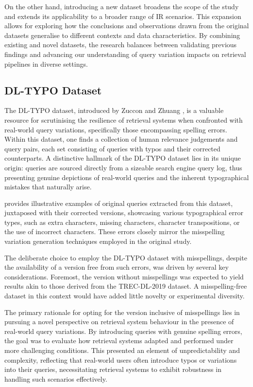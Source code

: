 On the other hand, introducing a new dataset broadens the scope of the study and extends its applicability to a broader range of IR scenarios. This expansion allows for exploring how the conclusions and observations drawn from the original datasets generalise to different contexts and data characteristics. By combining existing and novel datasets, the research balances between validating previous findings and advancing our understanding of query variation impacts on retrieval pipelines in diverse settings.

\subsection{DL-TYPO Dataset}
The DL-TYPO dataset, introduced by Zuccon and Zhuang \cite{characterbert}, is a valuable resource for scrutinising the resilience of retrieval systems when confronted with real-world query variations, specifically those encompassing spelling errors. Within this dataset, one finds a collection of human relevance judgements and query pairs, each set consisting of queries with typos and their corrected counterparts. A distinctive hallmark of the DL-TYPO dataset lies in its unique origin: queries are sourced directly from a sizeable search engine query log, thus presenting genuine depictions of real-world queries and the inherent typographical mistakes that naturally arise.

 provides illustrative examples of original queries extracted from this dataset, juxtaposed with their corrected versions, showcasing various typographical error types, such as extra characters, missing characters, character transpositions, or the use of incorrect characters. These errors closely mirror the misspelling variation generation techniques employed in the original study.

The deliberate choice to employ the DL-TYPO dataset with misspellings, despite the availability of a version free from such errors, was driven by several key considerations. Foremost, the version without misspellings was expected to yield results akin to those derived from the TREC-DL-2019 dataset. A misspelling-free dataset in this context would have added little novelty or experimental diversity.

The primary rationale for opting for the version inclusive of misspellings lies in pursuing a novel perspective on retrieval system behaviour in the presence of real-world query variations. By introducing queries with genuine spelling errors, the goal was to evaluate how retrieval systems adapted and performed under more challenging conditions. This presented an element of unpredictability and complexity, reflecting that real-world users often introduce typos or variations into their queries, necessitating retrieval systems to exhibit robustness in handling such scenarios effectively.

